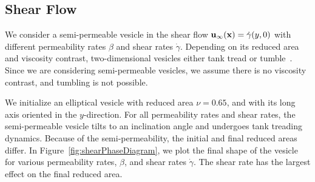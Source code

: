 \documentclass[9pt,twocolumn,twoside,lineno]{pnas-new}
\begin{document}
%


\subsection*{Shear Flow}
We consider a semi-permeable vesicle in the shear flow
$\mathbf{u}_{\infty}(\mathbf{x}) = \dot{\gamma} (y,0)$ with different permeability
rates $\beta$ and shear rates $\dot{\gamma}$. Depending on its reduced
area and viscosity contrast, two-dimensional vesicles either tank tread
or tumble~\cite{fin-lam-sei-gom2008,kra-win-sei-lip1996}. Since we are
considering semi-permeable vesicles, we assume there is no viscosity
contrast, and tumbling is not possible.

We initialize an elliptical vesicle with reduced area $\nu = 0.65$, and
with its long axis oriented in the $y$-direction. For all permeability
rates and shear rates, the semi-permeable vesicle tilts to an
inclination angle and undergoes tank treading dynamics. Because of the
semi-permeability, the initial and final reduced areas differ. In
Figure~\ref{fig:shearPhaseDiagram}, we plot the final shape of the
vesicle for various permeability rates, $\beta$, and shear rates
$\dot{\gamma}$. The shear rate has the largest effect on the final
reduced area.
\end{document}
